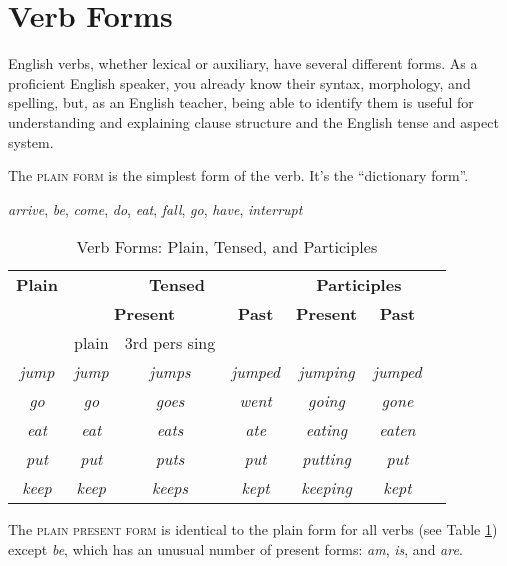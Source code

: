 \section{Verb Forms}\label{sec:verb-forms}

English verbs, whether lexical or auxiliary, have several different forms. As a proficient English speaker, you already know their syntax, morphology, and spelling, but, as an English teacher, being able to identify them is useful for understanding and explaining clause structure and the English tense and aspect system.

The \textsc{plain form} is the simplest form of the verb. It's the ``dictionary form''.

\ea \textit{arrive}, \textit{be}, \textit{come}, \textit{do}, \textit{eat}, \textit{fall}, \textit{go}, \textit{have}, \textit{interrupt}
\z

\begin{table}[ht]
    \centering
    \begin{tabular}{ccccccc}
       
        \textbf{Plain} & \multicolumn{3}{c}{\textbf{Tensed}} & \multicolumn{2}{c}{\textbf{Participles}} \\
        & \multicolumn{2}{c}{\textbf{Present}} & \textbf{Past} & \textbf{Present} & \textbf{Past} \\
        & plain & 3rd pers sing & &  &  \\
        \textit{jump} & \textit{jump} & \textit{jumps} & \textit{jumped} & \textit{jumping} & \textit{jumped} \\
        \textit{go} & \textit{go} & \textit{goes} & \textit{went} & \textit{going} & \textit{gone} \\
        \textit{eat} & \textit{eat} & \textit{eats} & \textit{ate} & \textit{eating} & \textit{eaten} \\
        \textit{put} & \textit{put} & \textit{puts} & \textit{put} & \textit{putting} & \textit{put} \\
        \textit{keep} & \textit{keep} & \textit{keeps} & \textit{kept} & \textit{keeping} & \textit{kept} \\
    \end{tabular}
    \caption{Verb Forms: Plain, Tensed, and Participles}
    \label{tab:verb-forms}
\end{table}

The \textsc{plain present form} is identical to the plain form for all verbs (see Table \ref{tab:verb-forms}) except \textit{be}, which has an unusual number of present forms: \textit{am}, \textit{is}, and \textit{are}.

